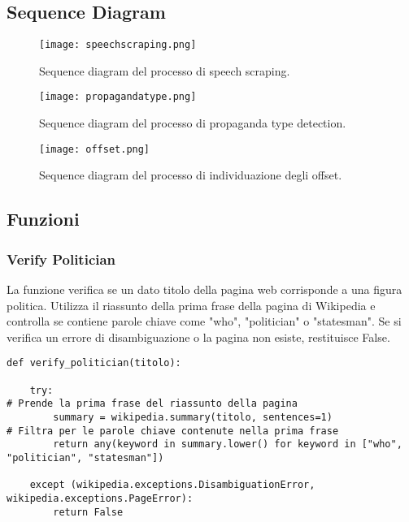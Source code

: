 \documentclass[12pt]{article}
\begin{document}
	\subsection{Sequence Diagram}
	\begin{figure}[h!]
		\centering
		\texttt{[image: speechscraping.png]}
		\caption{Sequence diagram del processo di speech scraping.}
		\label{fig:speechscraping}
		\vspace{1em} %
		\texttt{[image: propagandatype.png]}
		\caption{Sequence diagram del processo di propaganda type detection.}
		\label{fig:propagandatype}
		\vspace{1em} %
		\texttt{[image: offset.png]}
		\caption{Sequence diagram del processo di individuazione degli offset.}
		\label{fig:offset}
	\end{figure}
\newpage
	\subsection{Funzioni}
		
		\subsubsection{Verify Politician}
La funzione verifica se un dato titolo della pagina web corrisponde a una figura politica. Utilizza il riassunto della prima frase della pagina di Wikipedia e controlla se contiene parole chiave come "who", "politician" o "statesman". Se si verifica un errore di disambiguazione o la pagina non esiste, restituisce False.
		\begin{lstlisting}
def verify_politician(titolo):

	try:
# Prende la prima frase del riassunto della pagina
		summary = wikipedia.summary(titolo, sentences=1)
# Filtra per le parole chiave contenute nella prima frase
		return any(keyword in summary.lower() for keyword in ["who", "politician", "statesman"])

	except (wikipedia.exceptions.DisambiguationError, wikipedia.exceptions.PageError):
		return False
		\end{lstlisting}
		
\end{document}

